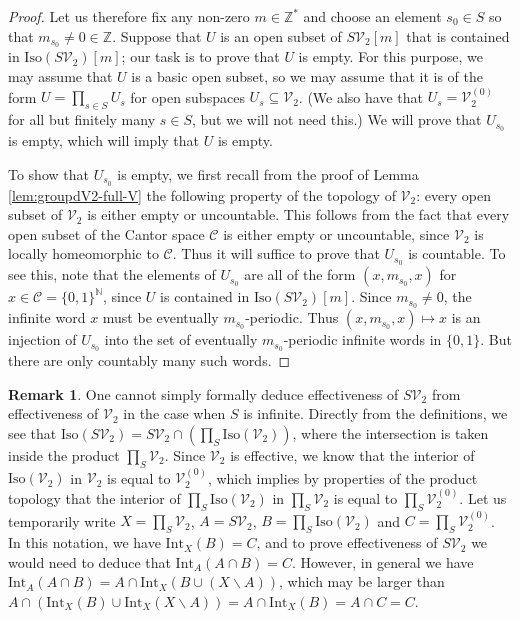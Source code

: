 \documentclass[10pt,a4paper]{amsart}
\numberwithin{equation}{section}
\numberwithin{figure}{section}
\theoremstyle{definition}
\newtheorem{rem}[thm]{Remark}
\newcommand{\cC}{\mathcal{C}}
\newcommand{\cV}{\mathcal{V}}
\newcommand{\bN}{\mathbb{N}}
\newcommand{\bZ}{\mathbb{Z}}
\begin{document}
\begin{proof}
Let us therefore fix any non-zero $m \in \bZ^*$ and choose an element $s_0 \in S$ so that $m_{s_0} \neq 0 \in \bZ$. Suppose that $U$ is an open subset of $S\cV_2[m]$ that is contained in $\mathrm{Iso}(S\cV_2)[m]$; our task is to prove that $U$ is empty. For this purpose, we may assume that $U$ is a basic open subset, so we may assume that it is of the form $U = \prod_{s \in S} U_s$ for open subspaces $U_s \subseteq \cV_2$. (We also have that $U_s = \cV_2^{(0)}$ for all but finitely many $s \in S$, but we will not need this.) We will prove that $U_{s_0}$ is empty, which will imply that $U$ is empty.

To show that $U_{s_0}$ is empty, we first recall from the proof of Lemma \ref{lem:groupdV2-full-V} the following property of the topology of $\cV_2$: every open subset of $\cV_2$ is either empty or uncountable. This follows from the fact that every open subset of the Cantor space $\cC$ is either empty or uncountable, since $\cV_2$ is locally homeomorphic to $\cC$. Thus it will suffice to prove that $U_{s_0}$ is countable. To see this, note that the elements of $U_{s_0}$ are all of the form $(x,m_{s_0},x)$ for $x \in \cC = \{0,1\}^\bN$, since $U$ is contained in $\mathrm{Iso}(S\cV_2)[m]$. Since $m_{s_0} \neq 0$, the infinite word $x$ must be eventually $m_{s_0}$-periodic. Thus $(x,m_{s_0},x) \mapsto x$ is an injection of $U_{s_0}$ into the set of eventually $m_{s_0}$-periodic infinite words in $\{0,1\}$. But there are only countably many such words.
\end{proof}

\begin{rem}
\label{rmk:SV2-effective}
One cannot simply formally deduce effectiveness of $S\cV_2$ from effectiveness of $\cV_2$ in the case when $S$ is infinite. Directly from the definitions, we see that $\mathrm{Iso}(S\cV_2) = S\cV_2 \cap \left( \prod_S \mathrm{Iso}(\cV_2) \right)$, where the intersection is taken inside the product $\prod_S \cV_2$. Since $\cV_2$ is effective, we know that the interior of $\mathrm{Iso}(\cV_2)$ in $\cV_2$ is equal to $\cV_2^{(0)}$, which implies by properties of the product topology that the interior of $\prod_S \mathrm{Iso}(\cV_2)$ in $\prod_S \cV_2$ is equal to $\prod_S \cV_2^{(0)}$. Let us temporarily write $X = \prod_S \cV_2$, $A = S\cV_2$, $B = \prod_S \mathrm{Iso}(\cV_2)$ and $C = \prod_S \cV_2^{(0)}$. In this notation, we have $\mathrm{Int}_X(B) = C$, and to prove effectiveness of $S\cV_2$ we would need to deduce that $\mathrm{Int}_A(A \cap B) = C$. However, in general we have $\mathrm{Int}_A(A\cap B) = A \cap \mathrm{Int}_X(B \cup (X \smallsetminus A))$, which may be larger than $A \cap (\mathrm{Int}_X(B) \cup \mathrm{Int}_X(X \smallsetminus A)) = A \cap \mathrm{Int}_X(B) = A \cap C = C$.
\end{rem}
\end{document}
